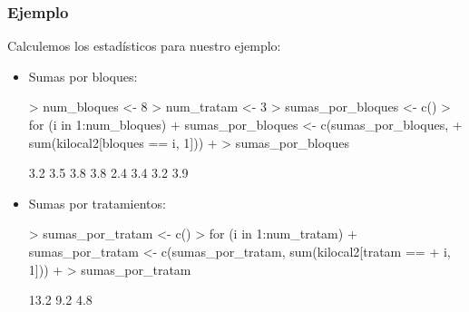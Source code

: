 \begin{frame}[fragile]
\frametitle{Ejemplo}
Calculemos los estadísticos para nuestro ejemplo:
{\footnotesize\begin{itemize}
\item<3-> Sumas por bloques:

\begin{Schunk}
\begin{Sinput}
> num_bloques <- 8
> num_tratam <- 3
> sumas_por_bloques <- c()
> for (i in 1:num_bloques) {
+     sumas_por_bloques <- c(sumas_por_bloques, 
+         sum(kilocal2[bloques == i, 1]))
+ }
> sumas_por_bloques
\end{Sinput}
\begin{Soutput}
[1] 3.2 3.5 3.8 3.8 2.4 3.4 3.2 3.9
\end{Soutput}
\end{Schunk}

\item<4-> Sumas por tratamientos:

\begin{Schunk}
\begin{Sinput}
> sumas_por_tratam <- c()
> for (i in 1:num_tratam) {
+     sumas_por_tratam <- c(sumas_por_tratam, sum(kilocal2[tratam == 
+         i, 1]))
+ }
> sumas_por_tratam
\end{Sinput}
\begin{Soutput}
[1] 13.2  9.2  4.8
\end{Soutput}
\end{Schunk}

\end{itemize}}
\end{frame}
